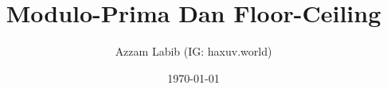 \documentclass[12pt]{scrartcl}
\title{Modulo-Prima Dan Floor-Ceiling}
\author{Azzam Labib (IG: haxuv.world)}
\date{\today}
\begin{document}
\maketitle
\renewcommand*\contentsname{Daftar Isi}
\tableofcontents

\newpage
    
\end{document}
